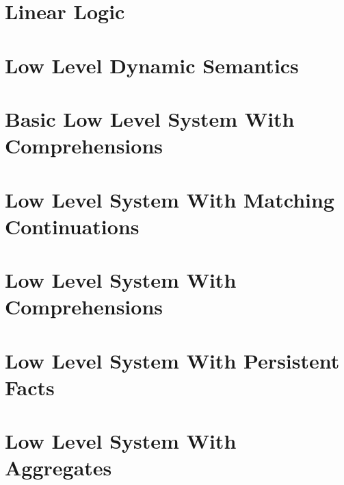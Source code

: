 \documentclass[9pt]{article}
\begin{document}
\section{Linear Logic}


\begin{comment}
\section{Optimization Ideas}

\end{comment}

\section{Low Level Dynamic Semantics}



\newcommand{\mz}{\m{m}_0 \;}
\newcommand{\mo}{\m{m}_1 \;}
\newcommand{\dz}{\m{d}_0 \;}
\newcommand{\done}{\m{d}_1 \;}
\newcommand{\az}{\m{a}_0 \;}
\newcommand{\ao}{\m{a}_1 \;}
\newcommand{\doz}{\m{do}_0 \;}
\newcommand{\doo}{\m{do}_1 \;}
\newcommand{\cont}{\m{cont} \;}
\newcommand{\contc}{\m{contc} \;}
\newcommand{\dc}{\m{dc} \;}

\section{Basic Low Level System With Comprehensions}



\section{Low Level System With Matching Continuations}



\section{Low Level System With Comprehensions}



\section{Low Level System With Persistent Facts}

\section{Low Level System With Aggregates}
\end{document}
